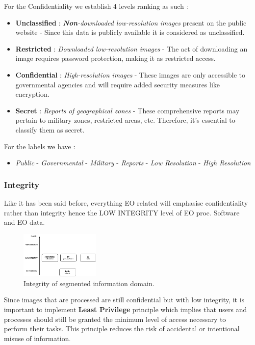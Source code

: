 \documentclass[12pt]{article}
\begin{document}
For the Confidentiality we establish 4 levels ranking as such : 
\begin{itemize}
    \item \textbf{Unclassified} : \textit{\textbf{Non}-downloaded low-resolution images} present on the public website - Since this data is publicly available it is considered as unclassified.
    \item \textbf{Restricted} : \textit{Downloaded low-resolution images } - The act of downloading an image requires password protection, making it as restricted access.
    \item \textbf{Confidential} : \textit{High-resolution images} - These images are only accessible to governmental agencies and will require added security measures like encryption.
    \item \textbf{Secret} : \textit{Reports of geographical zones} - These comprehensive reports may pertain to military zones, restricted areas, etc. Therefore, it's essential to classify them as secret.
\end{itemize}

For the labels we have : 
\begin{itemize}
    \item \textit{Public} - \textit{Governmental} - \textit{Military} - \textit{Reports} - \textit{Low Resolution} - \textit{High Resolution}
\end{itemize}

\subsubsection*{Integrity}
Like it has been said before, everything EO related will emphasise confidentiality rather than integrity hence the LOW INTEGRITY level of EO proc. Software and EO data. 
\begin{figure}[h]
    \centering
    \includegraphics[width=0.35\textwidth]{Figures/Solutions/classification_integ.png}
    \caption{Integrity of segmented information domain.}
\end{figure}

Since images that are processed are still confidential but with low integrity, it is important to implement \textbf{Least Privilege} principle which implies that users and processes should still be granted the minimum level of access necessary to perform their tasks. This principle reduces the risk of accidental or intentional misuse of information.
\end{document}
